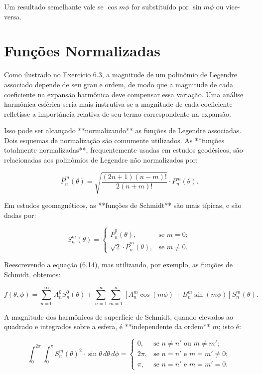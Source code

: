 Um resultado semelhante vale se $\cos m\phi$ for substituído por $\sin m\phi$ ou vice-versa.



\section{Funções Normalizadas}
 

Como ilustrado no Exercício 6.3, a magnitude de um polinômio de Legendre associado depende de seu grau e ordem, de modo que a magnitude de cada coeficiente na expansão harmônica deve compensar essa variação. Uma análise harmônica esférica seria mais instrutiva se a magnitude de cada coeficiente refletisse a importância relativa de seu termo correspondente na expansão.

Isso pode ser alcançado **normalizando** as funções de Legendre associadas. Dois esquemas de normalização são comumente utilizados. As **funções totalmente normalizadas**, frequentemente usadas em estudos geodésicos, são relacionadas aos polinômios de Legendre não normalizados por:

$$
\bar{P}_{n}^{m}(\theta) = \sqrt{\frac{(2n + 1)(n - m)!}{2(n + m)!}} \cdot P_{n}^{m}(\theta).
$$

Em estudos geomagnéticos, as **funções de Schmidt** são mais típicas, e são dadas por:

$$
S_{n}^{m}(\theta) =
\begin{cases}
\bar{P}_{n}^{0}(\theta), & \text{se } m = 0; \\
\sqrt{2} \cdot \bar{P}_{n}^{m}(\theta), & \text{se } m \ne 0.
\end{cases}
$$

Reescrevendo a equação (6.14), mas utilizando, por exemplo, as funções de Schmidt, obtemos:

$$
f(\theta, \phi) = \sum_{n=0}^{\infty} A_{n}^{0} S_{n}^{0}(\theta)
+ \sum_{n=1}^{\infty} \sum_{m=1}^{n} \left[ A_{n}^{m} \cos(m\phi) + B_{n}^{m} \sin(m\phi) \right] S_{n}^{m}(\theta). \tag{6.16}
$$

A magnitude dos harmônicos de superfície de Schmidt, quando elevados ao quadrado e integrados sobre a esfera, é **independente da ordem** $m$; isto é:

$$
\int_{0}^{2\pi} \int_{0}^{\pi} S_{n}^{m}(\theta)^2 \cdot \sin\theta \, d\theta \, d\phi =
\begin{cases}
0, & \text{se } n \ne n' \text{ ou } m \ne m'; \\
2\pi, & \text{se } n = n' \text{ e } m = m' \ne 0; \\
\pi, & \text{se } n = n' \text{ e } m = m' = 0.
\end{cases} \tag{6.17}
$$

